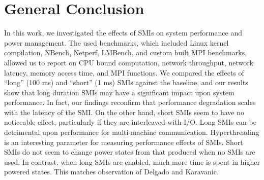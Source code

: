 \documentclass{IEEEtran}
\begin{document}
\section{General Conclusion}
In this work, we investigated the effects of SMIs on system performance and power management. The used benchmarks, which included Linux kernel compilation, NBench, Netperf, LMBench, and custom built MPI benchmarks, allowed us to report on CPU bound computation, network throughput, network latency, memory access time, and MPI functions. We compared the effects of ``long'' (100 ms) and ``short'' (1 ms) SMIs against the baseline, and our results show that long duration SMIs may have a significant impact upon system performance. In fact, our findings reconfirm that performance degradation scales with the latency of the SMI. On the other hand, short SMIs seem to have no noticeable effect, particularly if they are interleaved with I/O. Long SMIs can be detrimental upon performance for multi-machine communication. Hyperthreading is an interesting parameter for measuring performance effects of SMIs. Short SMIs do not seem to change power states from that produced when no SMIs are used. In contrast, when long SMIs are enabled, much more time is spent in higher powered states.
This matches observation of Delgado and Karavanic.



\end{document}
